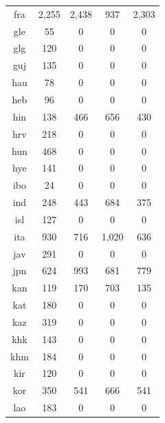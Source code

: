 \begin{table}[!htb]
\begin{minipage}[t]{0.45\textwidth}
\begin{tabular}{@{}ccccc@{}}
        fra & 2,255 & 2,438 & 937 & 2,303 \\
        gle & 55 & 0 & 0 & 0 \\
        glg & 120 & 0 & 0 & 0 \\
        guj & 135 & 0 & 0 & 0 \\
        hau & 78 & 0 & 0 & 0 \\
        heb & 96 & 0 & 0 & 0 \\
        hin & 138 & 466 & 656 & 430 \\
        hrv & 218 & 0 & 0 & 0 \\
        hun & 468 & 0 & 0 & 0 \\
        hye & 141 & 0 & 0 & 0 \\
        ibo & 24 & 0 & 0 & 0 \\
        ind & 248 & 443 & 684 & 375 \\
        isl & 127 & 0 & 0 & 0 \\
        ita & 930 & 716 & 1,020 & 636 \\
        jav & 291 & 0 & 0 & 0 \\
        jpn & 624 & 993 & 681 & 779 \\
        kan & 119 & 170 & 703 & 135 \\
        kat & 180 & 0 & 0 & 0 \\
        kaz & 319 & 0 & 0 & 0 \\
        khk & 143 & 0 & 0 & 0 \\
        khm & 184 & 0 & 0 & 0 \\
        kir & 120 & 0 & 0 & 0 \\
        kor & 350 & 541 & 666 & 541 \\
        lao & 183 & 0 & 0 & 0 \\
 

\end{tabular}
\end{minipage}
\end{table}
